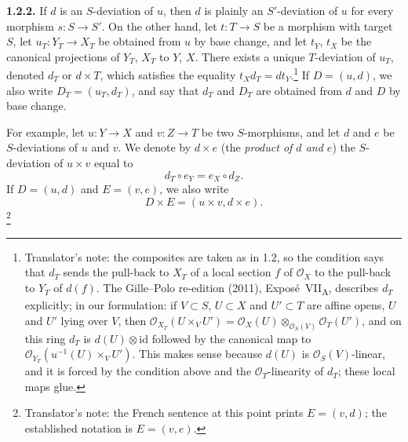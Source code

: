 \medskip
\noindent\textbf{1.2.2.}
\label{sga3:VIIA:1.2.2}
If \(d\) is an \(S\)-deviation of \(u\), then \(d\) is plainly an
\(S'\)-deviation of \(u\) for every morphism \(s:S\to S'\). On the other
hand, let \(t:T\to S\) be a morphism with target \(S\), let
\(u_T:Y_T\to X_T\) be obtained from \(u\) by base change, and let
\(t_Y\), \(t_X\) be the canonical projections of \(Y_T\), \(X_T\) to
\(Y\), \(X\). There exists a unique \(T\)-deviation of \(u_T\), denoted
\(d_T\) or \(d\times T\), which satisfies the equality
\(t_Xd_T=dt_Y\).\footnote{Translator's note: the composites are taken
as in 1.2, so the condition says that \(d_T\) sends the pull-back to
\(X_T\) of a local section \(f\) of \(\mathcal O_X\) to the pull-back to
\(Y_T\) of \(d(f)\). The Gille--Polo re-edition (2011),
Expos\'e~VII\textsubscript{A}, describes \(d_T\) explicitly; in our
formulation: if \(V\subset S\), \(U\subset X\) and \(U'\subset T\) are
affine opens, \(U\) and \(U'\) lying over \(V\), then
\(\mathcal O_{X_T}(U\times_VU')
=\mathcal O_X(U)\otimes_{\mathcal O_S(V)}\mathcal O_T(U')\), and on
this ring \(d_T\) is \(d(U)\otimes\mathrm{id}\) followed by the
canonical map to \(\mathcal O_{Y_T}(u^{-1}(U)\times_VU')\). This makes
sense because \(d(U)\) is \(\mathcal O_S(V)\)-linear, and it is forced
by the condition above and the \(\mathcal O_T\)-linearity of \(d_T\);
these local maps glue.}
If \(D=(u,d)\), we also write \(D_T=(u_T,d_T)\), and say that \(d_T\)
and \(D_T\) are obtained from \(d\) and \(D\) by base change.

For example, let \(u:Y\to X\) and \(v:Z\to T\) be two \(S\)-morphisms,
and let \(d\) and \(e\) be \(S\)-deviations of \(u\) and \(v\). We denote
by \(d\times e\) (the \emph{product of \(d\) and \(e\)}) the
\(S\)-deviation of \(u\times v\) equal to
\[
  d_T\circ e_Y=e_X\circ d_Z.
\]
If \(D=(u,d)\) and \(E=(v,e)\), we also write
\[
  D\times E=(u\times v,d\times e).
\]
\footnote{Translator's note: the French sentence at this point prints
\(E=(v,d)\); the established notation is \(E=(v,e)\).}

